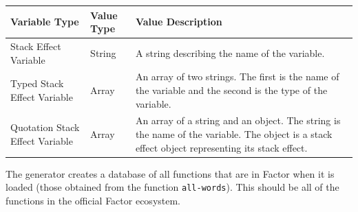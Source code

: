 \documentclass[
]{article}
\begin{document}
\begin{longtable}[]{@{}lll@{}}
\toprule
\begin{minipage}[b]{0.16\columnwidth}\raggedright
Variable Type\strut
\end{minipage} & \begin{minipage}[b]{0.06\columnwidth}\raggedright
Value Type\strut
\end{minipage} & \begin{minipage}[b]{0.70\columnwidth}\raggedright
Value Description\strut
\end{minipage}\tabularnewline
\midrule
\endhead
\begin{minipage}[t]{0.16\columnwidth}\raggedright
Stack Effect Variable\strut
\end{minipage} & \begin{minipage}[t]{0.06\columnwidth}\raggedright
String\strut
\end{minipage} & \begin{minipage}[t]{0.70\columnwidth}\raggedright
A string describing the name of the variable.\strut
\end{minipage}\tabularnewline
\begin{minipage}[t]{0.16\columnwidth}\raggedright
Typed Stack Effect Variable\strut
\end{minipage} & \begin{minipage}[t]{0.06\columnwidth}\raggedright
Array\strut
\end{minipage} & \begin{minipage}[t]{0.70\columnwidth}\raggedright
An array of two strings. The first is the name of the variable and the
second is the type of the variable.\strut
\end{minipage}\tabularnewline
\begin{minipage}[t]{0.16\columnwidth}\raggedright
Quotation Stack Effect Variable\strut
\end{minipage} & \begin{minipage}[t]{0.06\columnwidth}\raggedright
Array\strut
\end{minipage} & \begin{minipage}[t]{0.70\columnwidth}\raggedright
An array of a string and an object. The string is the name of the
variable. The object is a stack effect object representing its stack
effect.\strut
\end{minipage}\tabularnewline
\bottomrule
\end{longtable}

The generator creates a database of all functions that are in Factor
when it is loaded (those obtained from the function \texttt{all-words}).
This should be all of the functions in the official Factor ecosystem.
\end{document}
